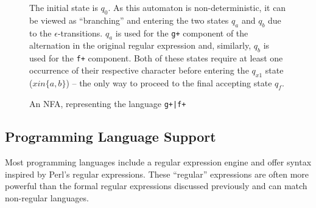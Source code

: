 \documentclass[a4paper,openany]{book}
\begin{document}
\begin{figure}[H]
	\begin{MyMdframed}
	\vspace{0.5em}
 

\caption{\label{figure:nfa:1} An NFA, representing the language \texttt{g+|f+}}
\vspace{0.5em}
\captionsetup{style=default}

		
\vspace{0.5em}

The initial state is $q_0$. As this automaton is non-deterministic, it can be viewed as ``branching'' and entering the two states $q_a$ and $q_b$ due to the $\epsilon$-transitions. $q_a$ is used for the \texttt{g+} component of the alternation in the original regular expression and, similarly, $q_b$ is used for the \texttt{f+} component. Both of these states require at least one occurrence of their respective character before entering the $q_{x1}$ state ($x in \{a, b\}$) -- the only way to proceed to the final accepting state $q_f$. 

\vspace{0.5em}

\end{MyMdframed}
\end{figure}

\subsection{Programming Language Support}

Most programming languages include a regular expression engine and offer syntax inspired by Perl's regular expressions. These ``regular'' expressions are often more powerful than the formal regular expressions discussed previously and can match non-regular languages.
\end{document}
